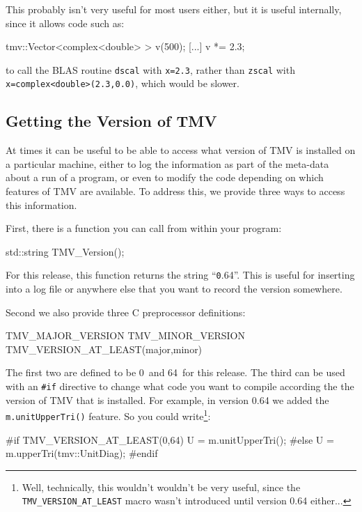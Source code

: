 \documentclass[twoside,letterpaper,11pt]{article}
\newcommand{\tmvversion}{0.64}
\newcommand{\tmvmajorversion}{0}
\newcommand{\tmvminorversion}{64}
\newcommand{\tttmvversion}{\texttt \tmvversion}
\renewcommand{\tt}[1]{{\lstinline {#1}}}
\begin{document}
This probably isn't very useful for most users either, but it is useful internally,
since it allows code such as:
\begin{tmvcode}
tmv::Vector<complex<double> > v(500);
[...]
v *= 2.3;
\end{tmvcode}
to call the BLAS routine \tt{dscal} with \tt{x=2.3}, rather than \tt{zscal}
with \tt{x=complex<double>(2.3,0.0)}, which would be slower.

\subsection{Getting the Version of TMV}

At times it can be useful to be able to access what version of TMV is installed on a 
particular machine, either to log the information as part of the meta-data about a
run of a program, or even to modify the code depending on which features of TMV
are available.  To address this, we provide three ways to access this information.

First, there is a function you can call from within your program:
\begin{tmvcode}
std::string TMV_Version();
\end{tmvcode}
For this release, this function returns the string ``\tttmvversion''.  This is useful for inserting
into a log file or anywhere else that you want to record the version somewhere.

Second we also provide three C preprocessor definitions:
\begin{tmvcode}
TMV_MAJOR_VERSION
TMV_MINOR_VERSION
TMV_VERSION_AT_LEAST(major,minor)
\end{tmvcode}
The first two are defined to be \tmvmajorversion\ and \tmvminorversion\ for this release.
The third can be used with an \tt{#if} directive to change what code you want to compile
according the the version of TMV that is installed.
For example, in version 0.64 we added the \tt{m.unitUpperTri()} feature.  So you could
write\footnote{
Well, technically, this wouldn't wouldn't be very useful, 
since the \tt{TMV_VERSION_AT_LEAST} macro
wasn't introduced until version 0.64 either...}:
\begin{tmvcode}
#if TMV_VERSION_AT_LEAST(0,64)
U = m.unitUpperTri();
#else
U = m.upperTri(tmv::UnitDiag);
#endif
\end{tmvcode}
\end{document}
